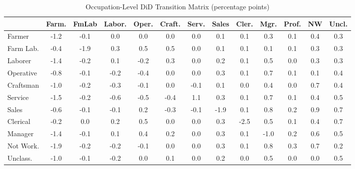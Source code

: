 \documentclass[12pt]{article}
\begin{document}
\begin{table}[H]
\centering
\caption{Occupation-Level DiD Transition Matrix (percentage points)}
\label{tab:did_matrix}
\begin{adjustbox}{max width=\textwidth}
\begin{threeparttable}
\begin{tabular}{l*{12}{S[table-format=-1.1,table-auto-round]}}
\toprule
& {Farm.} & {FmLab} & {Labor.} & {Oper.} & {Craft.} & {Serv.} & {Sales} & {Cler.} & {Mgr.} & {Prof.} & {NW} & {Uncl.} \\
\midrule
Farmer     & -1.2 & -0.1 &  0.0 &  0.0 &  0.0 &  0.0 & 0.1 & 0.1 & 0.3 & 0.1 & 0.4 & 0.3 \\
Farm Lab.  & -0.4 & -1.9 &  0.3 &  0.5 &  0.5 &  0.0 & 0.1 & 0.1 & 0.1 & 0.1 & 0.3 & 0.3 \\
Laborer    & -1.4 & -0.2 &  0.1 & -0.2 &  0.3 &  0.0 & 0.2 & 0.1 & 0.5 & 0.0 & 0.3 & 0.3 \\
Operative  & -0.8 & -0.1 & -0.2 & -0.4 &  0.0 &  0.0 & 0.3 & 0.1 & 0.7 & 0.1 & 0.1 & 0.4 \\
Craftsman  & -1.0 & -0.2 & -0.3 & -0.1 &  0.0 & -0.1 & 0.1 & 0.0 & 0.4 & 0.0 & 0.7 & 0.4 \\
Service    & -1.5 & -0.2 & -0.6 & -0.5 & -0.4 &  1.1 & 0.3 & 0.1 & 0.7 & 0.1 & 0.4 & 0.5 \\
Sales      & -0.6 & -0.1 & -0.1 &  0.2 & -0.3 & -0.1 &-1.9 & 0.1 & 0.8 & 0.2 & 0.9 & 0.7 \\
Clerical   & -0.2 &  0.0 &  0.2 &  0.5 &  0.0 &  0.0 & 0.3 &-2.5 & 0.5 & 0.1 & 0.4 & 0.7 \\
Manager    & -1.4 & -0.1 &  0.1 &  0.4 &  0.2 &  0.0 & 0.3 & 0.1 &-1.0 & 0.2 & 0.6 & 0.5 \\
Not Work.  & -1.9 & -0.2 & -0.2 & -0.1 &  0.0 &  0.0 & 0.3 & 0.1 & 0.8 & 0.3 & 0.7 & 0.2 \\
Unclass.   & -1.0 & -0.1 & -0.2 &  0.0 &  0.1 &  0.0 & 0.2 & 0.0 & 0.5 & 0.0 & 0.0 & 0.5 \\
\bottomrule
\end{tabular}
\begin{tablenotes}[flushleft]
\small

\end{tablenotes}
\end{threeparttable}
\end{adjustbox}
\end{table}
\end{document}
